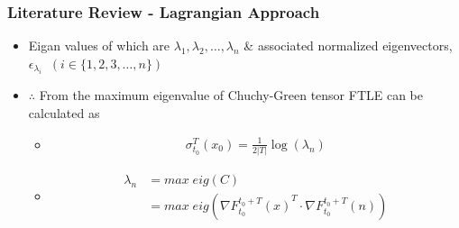 \documentclass[../presentation.tex]{subfiles}
\begin{document}
\begin{frame}
  \frametitle{Literature Review - Lagrangian Approach}

  \begin{itemize}
    \item Eigan values of which are \(\lambda_1, \lambda_2, \dots, \lambda_n\) \& associated normalized eigenvectors, \(\epsilon_{\lambda_i}\;\; (i \in \{1, 2, 3, \dots, n\})\)

    \item \(\therefore\) From the maximum eigenvalue of Chuchy-Green tensor FTLE can be calculated as
    \begin{itemize}
      \item \begin{equation}
        \begin{aligned}
          \sigma_{t_0}^T (x_0) = \frac{1}{2|T|} \log(\lambda_n)
        \end{aligned}
      \end{equation}
      
      \item \begin{equation}
        \begin{aligned}
          \lambda_n &= max\; eig (C) \\
          &= max\; eig(\nabla {F_{t_0}^{t_0 + T}(x)}^T \cdot \nabla F_{t_0}^{t_0 + T}(n))
        \end{aligned}
      \end{equation}
    \end{itemize}
  \end{itemize}
\end{frame}
\end{document}

